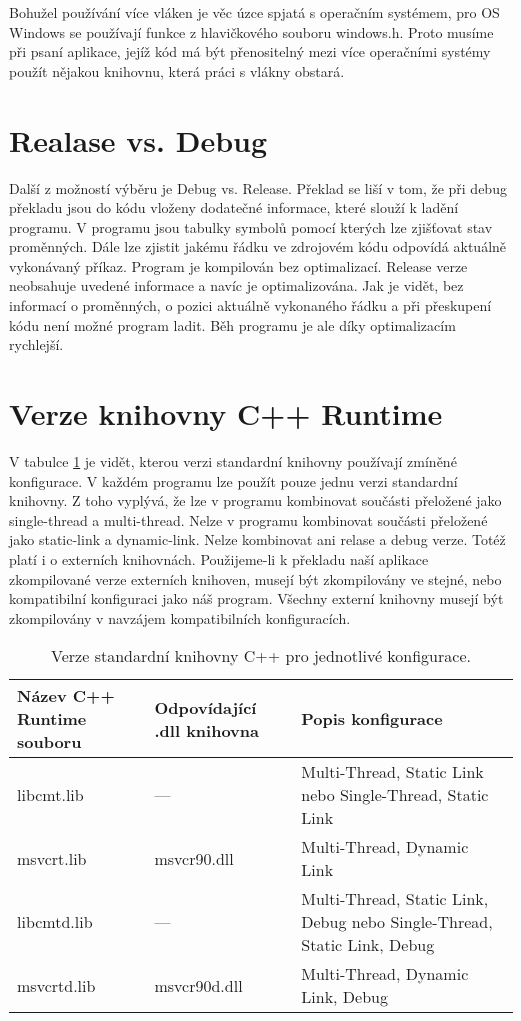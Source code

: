Bohužel používání více vláken je věc úzce spjatá s operačním systémem, pro OS Windows se používají funkce z hlavičkového souboru windows.h. Proto musíme při psaní aplikace, jejíž kód má být přenositelný mezi více operačními systémy použít nějakou knihovnu, která práci s vlákny obstará.




\section{Realase vs. Debug}
\label{releasedebug}
Další z možností výběru je Debug vs. Release. Překlad se liší v tom, že při debug překladu jsou do kódu vloženy dodatečné informace, které slouží k ladění programu. V programu jsou tabulky symbolů pomocí kterých lze zjišťovat stav proměnných. Dále lze zjistit jakému řádku ve zdrojovém kódu odpovídá aktuálně vykonávaný příkaz. Program je kompilován bez optimalizací. Release verze neobsahuje uvedené informace a navíc je optimalizována. Jak je vidět, bez informací o proměnných, o pozici aktuálně vykonaného řádku a při přeskupení kódu není možné program ladit. Běh programu je ale díky optimalizacím rychlejší.


\section{Verze knihovny C++ Runtime}
V tabulce \ref{table:stdlib} je vidět, kterou verzi standardní knihovny používají zmíněné konfigurace. V každém programu lze použít pouze jednu verzi standardní knihovny. Z toho vyplývá, že lze v programu kombinovat součásti přeložené jako single-thread a multi-thread. Nelze v programu kombinovat součásti přeložené jako static-link a dynamic-link. Nelze kombinovat ani relase a debug verze. Totéž platí i o externích knihovnách. Použijeme-li k překladu naší aplikace zkompilované verze externích knihoven, musejí být zkompilovány ve stejné, nebo kompatibilní konfiguraci jako náš program. Všechny externí knihovny musejí být zkompilovány v navzájem kompatibilních konfiguracích.

\begin{table}[ht]
	\caption{Verze standardní knihovny C++ pro jednotlivé konfigurace.\cite{msdn}}
  \label{table:stdlib}
	\centering
\begin{tabular}{| p{3cm} | p{3cm} | p{7.5cm} | }
  \hline                       
  Název C++ Runtime souboru & Odpovídající .dll knihovna & Popis konfigurace\\
  \hline
  \hline                     
  libcmt.lib & ---  & Multi-Thread, Static Link nebo Single-Thread, Static Link\\
  \hline
  msvcrt.lib & msvcr90.dll  & Multi-Thread, Dynamic Link\\
  \hline
  libcmtd.lib & ---  & Multi-Thread, Static Link, Debug nebo Single-Thread, Static Link, Debug\\
  \hline
  msvcrtd.lib & msvcr90d.dll & Multi-Thread, Dynamic Link, Debug\\
  \hline
\end{tabular}
\end{table}


